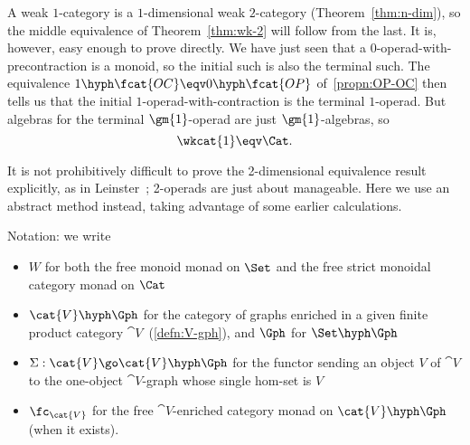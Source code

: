 A weak $1$-category%
%
%
is a $1$-dimensional weak $2$-category
(Theorem~\ref{thm:n-dim}), so the middle equivalence of
Theorem~\ref{thm:wk-2} will follow from the last.  It is, however, easy
enough to prove directly.  We have just seen that a
$0$-operad-with-precontraction is a monoid, so the initial such is also the
terminal such.  The equivalence $1\hyph\fcat{OC} \eqv 0\hyph\fcat{OP}$
of~\ref{propn:OP-OC} then tells us that the initial
$1$-operad-with-contraction is the terminal $1$-operad.  But algebras for
the terminal $\gm{1}$-operad are just $\gm{1}$-algebras, so
\[
\wkcat{1} \eqv \Cat.
\]

It is not prohibitively difficult to prove the 2-dimensional equivalence
result explicitly, as in Leinster~\cite[4.8]{OHDCT}; 2-operads are just
about manageable.  Here we use an abstract method instead, taking advantage
of some earlier calculations.

Notation: we write 
% 
\begin{itemize}
\item $W$%
% 
% 
for both the free monoid monad on $\Set$ and the free strict
monoidal category monad on $\Cat$
\item $\cat{V}\hyph\Gph$ for the category of graphs%
%
%
enriched in a given
finite product category $\cat{V}$~(\ref{defn:V-gph}), and $\Gph$%
% 
% 
for
$\Set\hyph\Gph$
\item $\Sigma: \cat{V} \go \cat{V}\hyph\Gph$%
% 
%
%
% 
for the functor sending an
object $V$ of $\cat{V}$ to the one-object $\cat{V}$-graph whose single
hom-set is $V$
\item $\fc_\cat{V}$%
% 
% 
for the free%
%
%
$\cat{V}$-enriched category monad on
$\cat{V}\hyph\Gph$ (when it exists).
\end{itemize}

